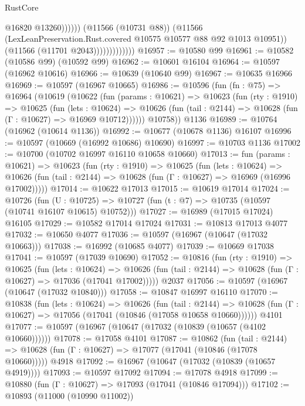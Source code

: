 \begin{lexlean}{RustCore}
\begin{coremodule}
                                      @16820
                                      @13260))))))
                          (@11566 (@10731 @88))
                          (@11566
                            (LexLeanPreservation.Rust.covered @10575 @10577 @88 @92 @1013 @10951))
                          (@11566 (@11701 @2043)))))))))))))
@16957 := @10580 @99
@16961 := @10582 (@10586 @99) (@10592 @99)
@16962 := @10601 @16104
@16964 := @10597 (@16962 @10616)
@16966 := @10639 (@10640 @99)
@16967 := @10635 @16966
@16969 := @10597 (@16967 @10665)
@16986 := @10596
    (fun (fn : @75) =>
    @16964
      (@10619
        (@10622
          (fun (params : @10621) =>
          @10623
            (fun (rty : @1910) =>
            @10625
              (fun (lets : @10624) =>
              @10626 (fun (tail : @2144) => @10628 (fun (Γ : @10627) => @16969 @10712))))))
        @10758))
    @1136
@16989 := @10764 (@16962 (@10614 @1136))
@16992 := @10677 (@10678 @1136) @16107
@16996 := @10597 (@10669 (@16992 @10686) @10690)
@16997 := @10703 @1136
@17002 := @10700 (@10702 @16997 @16110 @10658 @10660)
@17013 := fun (params : @10621) =>
  @10623
    (fun (rty : @1910) =>
    @10625
      (fun (lets : @10624) =>
      @10626 (fun (tail : @2144) => @10628 (fun (Γ : @10627) => @16969 (@16996 @17002)))))
@17014 := @10622 @17013
@17015 := @10619 @17014
@17024 := @10726
    (fun (U : @10725) => @10727 (fun (t : @7) => @10735 (@10597 (@10741 @16107 @10615) @10752)))
@17027 := @16989 (@17015 @17024) @16105
@17029 := @10582 @17014 @17024
@17031 := @10813 @17013 @4077
@17032 := @10650 @4077
@17036 := @10597 (@16967 (@10647 (@17032 @10663)))
@17038 := @16992 (@10685 @4077)
@17039 := @10669 @17038
@17041 := @10597 (@17039 @10690)
@17052 := @10816
    (fun (rty : @1910) =>
    @10625
      (fun (lets : @10624) =>
      @10626 (fun (tail : @2144) => @10628 (fun (Γ : @10627) => @17036 (@17041 @17002)))))
    @2037
@17056 := @10597 (@16967 (@10647 (@17032 @10840)))
@17058 := @10847 @16997 @16110
@17070 := @10838
    (fun (lets : @10624) =>
    @10626
      (fun (tail : @2144) =>
      @10628 (fun (Γ : @10627) => @17056 (@17041 (@10846 (@17058 @10658 @10660))))))
    @4101
@17077 := @10597 (@16967 (@10647 (@17032 (@10839 (@10657 (@4102 @10660))))))
@17078 := @17058 @4101
@17087 := @10862
    (fun (tail : @2144) => @10628 (fun (Γ : @10627) => @17077 (@17041 (@10846 (@17078 @10660)))))
    @4918
@17092 := @16967 (@10647 (@17032 (@10839 (@10657 @4919))))
@17093 := @10597 @17092
@17094 := @17078 @4918
@17099 := @10880 (fun (Γ : @10627) => @17093 (@17041 (@10846 @17094)))
@17102 := @10893 (@11000 (@10990 @11002))

\end{coremodule}
\end{lexlean}
